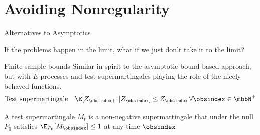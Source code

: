 \documentclass[aspectratio=169, professionalfonts, handout]{beamer}
\newcommand{\prode}[2]{E_{#1}^{#2}}
\begin{document}



\section{Avoiding Nonregularity}
\begin{frame}{Alternatives to Asymptotics}
	\vfill

	If the problems happen in the limit, what if we just don't take it to the limit?

	\vfill
\end{frame}

\begin{frame}{Finite-sample bounds}
	Similar in spirit to the asymptotic bound-based approach, but with
	$E$-processes and test	supermartingales playing the role of the nicely behaved functions.
	\vfill
	\[\text{Test supermartingale} \quad \E[Z_{\obsindex + 1} | Z_{\obsindex}] \leq
		Z_{\obsindex} \, \forall \obsindex \in \mbbN^+ \]

	\vfill \pause

	A test supermartingale $M_t$ is a non-negative supermartingale that under
	the null $P_0$ satisfies $\E_{P_0}[M_\obsindex] \leq 1$ at any time $\obsindex$



\end{frame}


\end{document}
